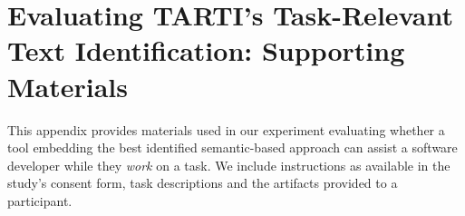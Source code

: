 \chapter{Evaluating TARTI's Task-Relevant Text Identification: Supporting Materials}

This appendix provides materials used in our experiment evaluating whether a tool embedding the best identified  semantic-based approach can assist a software developer while they \textit{work} on a task.
We include instructions as available in the study's consent form,
task descriptions and the artifacts provided to a participant.


